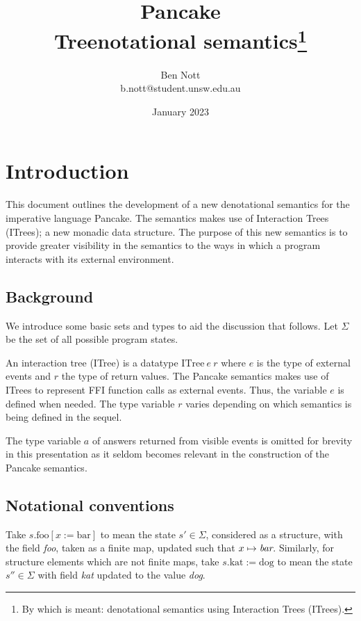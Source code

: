 \documentclass{article}
\title{Pancake\\\large Treenotational semantics\footnote{By which is meant: denotational semantics using Interaction Trees (ITrees).}}
\author{Ben Nott\\b.nott@student.unsw.edu.au}
\date{January 2023}
\begin{document}
\maketitle

\newcommand{\sem}[1]{\llbracket #1 \rrbracket}
\newcommand{\abs}[1]{\lambda #1.\ }


\section{Introduction}
\label{sec:introduction}

This document outlines the development of a new denotational semantics for the imperative language Pancake. The semantics makes use of Interaction Trees (ITrees); a new monadic data structure. The purpose of this new semantics is to provide greater visibility in the semantics to the ways in which a program interacts with its external environment.

\subsection{Background}
\label{sec:background}

We introduce some basic sets and types to aid the discussion that follows. Let $\Sigma$ be the set of all possible program states.

An interaction tree (ITree) is a datatype $\text{ITree}\ e\ r$ where $e$ is the type of external events and $r$ the type of return values. The Pancake semantics makes use of ITrees to represent FFI function calls as external events. Thus, the variable $e$ is defined when needed. The type variable $r$ varies depending on which semantics is being defined in the sequel.

The type variable $a$ of answers returned from visible events is omitted for brevity in this presentation as it seldom becomes relevant in the construction of the Pancake semantics.

\subsection{Notational conventions}

Take $s.\text{foo}[x := \text{bar}]$ to mean the state $s' \in \Sigma$, considered as a structure, with the field \emph{foo}, taken as a finite map, updated such that $x \mapsto \emph{bar}$. Similarly, for structure elements which are not finite maps, take $s.\text{kat} := \text{dog}$ to mean the state $s'' \in \Sigma$ with field \emph{kat} updated to the value \emph{dog}.
\end{document}
